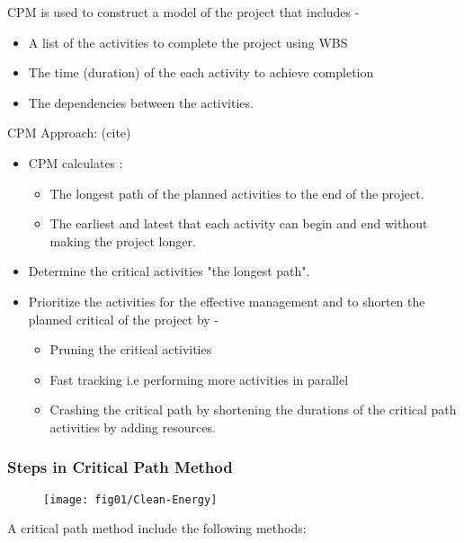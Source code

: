 CPM is used to construct a model of the project that includes -
\begin{itemize}
	\item A list of the activities to complete the project using WBS
		\item The time (duration) of the each activity to achieve completion 
			\item The dependencies between the activities.
\end{itemize}






CPM Approach: (cite)

\begin{itemize}
	\item CPM calculates :
	\begin{itemize}
		\item The longest path of the planned activities to the end of the project.
		\item The earliest and latest that each activity can begin and end without making the project longer.
	\end{itemize}
		\item Determine the critical activities "the longest path".
		\item Prioritize the activities for the effective management and to shorten the planned critical of the project by -
		\begin{itemize}
			\item Pruning the critical activities 
				\item Fast tracking i.e performing more activities in parallel 
			\item Crashing the critical path by shortening the durations of the critical path activities by adding resources. 
		\end{itemize}
\end{itemize}



\subsubsection{Steps in Critical Path Method }

\begin{figure}
	\centering
	\texttt{[image: fig01/Clean-Energy]}
\end{figure}

A critical path method include the following methods:

